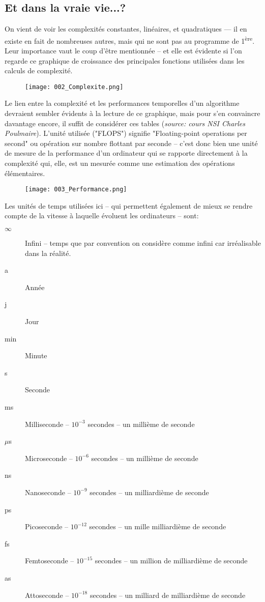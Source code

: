 \documentclass[12pt]{article}
\begin{document}
	\subsection{Et dans la vraie vie...?}
	On vient de voir les complexités constantes, linéaires, et quadratiques --- il en existe en fait de nombreuses autres, mais qui ne sont pas au programme de 1\textsuperscript{ère}. Leur importance vaut le coup d'être mentionnée -- et elle est évidente si l'on regarde ce graphique de croissance des principales fonctions utilisées dans les calculs de complexité.
	
	\begin{figure}[ht]
		\centering
		\texttt{[image: 002\_Complexite.png]}
	\end{figure}
	
	Le lien entre la complexité et les performances temporelles d'un algorithme devraient sembler évidents à la lecture de ce graphique, mais pour s'en convaincre davantage encore, il suffit de considérer ces tables (\textit{source: cours NSI Charles Poulmaire}). L'unité utilisée ("FLOPS") signifie "Floating-point operations per second" ou opération sur nombre flottant par seconde -- c'est donc bien une unité de mesure de la performance d'un ordinateur qui se rapporte directement à la complexité qui, elle, est un mesurée comme une estimation des opérations élémentaires.
	
	\begin{figure}[H]
		\centering
		\texttt{[image: 003\_Performance.png]}
	\end{figure}
	
	Les unités de temps utilisées ici  -- qui permettent également de mieux se rendre compte de la vitesse à laquelle évoluent les ordinateurs -- sont:
	\begin{description}
		\item[$\infty$] Infini -- temps que par convention on considère comme infini car irréalisable dans la réalité.
		\item[a] Année
		\item[j] Jour
		\item[min] Minute
		\item[s] Seconde
		\item [ms] Milliseconde -- $10^{-3}$ secondes -- un millième de seconde
		\item[$\mu$s] Microseconde -- $10^{-6}$ secondes -- un millième de seconde
		\item[ns] Nanoseconde -- $10^{-9}$ secondes -- un milliardième de seconde
		\item[ps] Picoseconde -- $10^{-12}$ secondes -- un mille milliardième de seconde
		\item[fs] Femtoseconde -- $10^{-15}$ secondes -- un million de milliardième de seconde
		\item[as] Attoseconde -- $10^{-18}$ secondes -- un milliard de milliardième de seconde
	\end{description}
	
\end{document}
